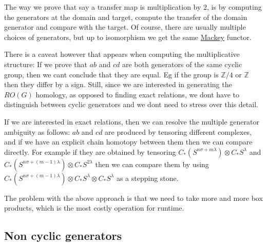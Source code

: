 \begin{DoxyItemize}
\item The way we prove that say a transfer map is multiplication by $2$, is by computing the generators at the domain and target, compute the transfer of the domain generator and compare with the target. Of course, there are usually multiple choices of generators, but up to isomorphism we get the same \hyperlink{namespaceMackey}{Mackey} functor.
\item There is a caveat however that appears when computing the multiplicative structure\+: If we prove that $ab$ and $cd$ are both generators of the same cyclic group, then we can\textquotesingle{}t conclude that they are equal. Eg if the group is $\mathbb Z/4$ or $\mathbb Z$ then they differ by a sign. Still, since we are interested in generating the $RO(G)$ homology, as opposed to finding exact relations, we don\textquotesingle{}t have to distinguish between cyclic generators and we don\textquotesingle{}t need to stress over this detail.
\item If we are interested in exact relations, then we can resolve the multiple generator ambiguity as follows\+: $ab$ and $cd$ are produced by tensoring different complexes, and if we have an explicit chain homotopy between them then we can compare directly. For example if they are obtained by tensoring $C_*(S^{n\sigma+m\lambda})\otimes C_*S^{\lambda}$ and $C_*(S^{n\sigma+(m-1)\lambda})\otimes C_*S^{2\lambda}$ then we can compare them by using $C_*(S^{n\sigma+(m-1)\lambda})\otimes C_*S^{\lambda}\otimes C_*S^{\lambda}$ as a stepping stone.
\item The problem with the above approach is that we need to take more and more box products, which is the most costly operation for runtime.
\end{DoxyItemize}\hypertarget{math_noncycl}{}\subsection{Non cyclic generators}\label{math_noncycl}

